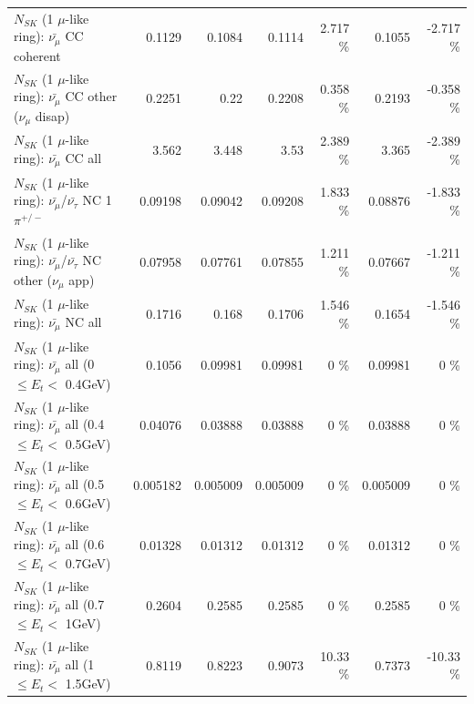 \begin{table}
\begin{tabular}{| l | r | r | r  r | r  r |}
                       $N_{SK}$ (1 $\mu$-like ring): $\bar{\nu_\mu}$ CC coherent &          0.1129 &          0.1084 &          0.1114 &    2.717 \%  &          0.1055 &   -2.717 \%  \\ 
        $N_{SK}$ (1 $\mu$-like ring): $\bar{\nu_\mu}$ CC other ($\nu_\mu$ disap) &          0.2251 &            0.22 &          0.2208 &    0.358 \%  &          0.2193 &   -0.358 \%  \\ 
                          $N_{SK}$ (1 $\mu$-like ring): $\bar{\nu_{\mu}}$ CC all &           3.562 &           3.448 &            3.53 &    2.389 \%  &           3.365 &   -2.389 \%  \\ 
\hline
  $N_{SK}$ (1 $\mu$-like ring): $\bar{\nu_\mu}$/$\bar{\nu_\tau}$ NC 1$\pi^{+/-}$ &         0.09198 &         0.09042 &         0.09208 &    1.833 \%  &         0.08876 &   -1.833 \%  \\ 
$N_{SK}$ (1 $\mu$-like ring): $\bar{\nu_\mu}$/$\bar{\nu_\tau}$ NC other ($\nu_\mu$ app) &         0.07958 &         0.07761 &         0.07855 &    1.211 \%  &         0.07667 &   -1.211 \%  \\ 
                          $N_{SK}$ (1 $\mu$-like ring): $\bar{\nu_{\mu}}$ NC all &          0.1716 &           0.168 &          0.1706 &    1.546 \%  &          0.1654 &   -1.546 \%  \\ 
\hline
   $N_{SK}$ (1 $\mu$-like ring): $\bar{\nu_{\mu}}$ all (0 $\leq E_{t} <$ 0.4GeV) &          0.1056 &         0.09981 &         0.09981 &        0 \%  &         0.09981 &        0 \%  \\ 
 $N_{SK}$ (1 $\mu$-like ring): $\bar{\nu_{\mu}}$ all (0.4 $\leq E_{t} <$ 0.5GeV) &         0.04076 &         0.03888 &         0.03888 &        0 \%  &         0.03888 &        0 \%  \\ 
 $N_{SK}$ (1 $\mu$-like ring): $\bar{\nu_{\mu}}$ all (0.5 $\leq E_{t} <$ 0.6GeV) &        0.005182 &        0.005009 &        0.005009 &        0 \%  &        0.005009 &        0 \%  \\ 
 $N_{SK}$ (1 $\mu$-like ring): $\bar{\nu_{\mu}}$ all (0.6 $\leq E_{t} <$ 0.7GeV) &         0.01328 &         0.01312 &         0.01312 &        0 \%  &         0.01312 &        0 \%  \\ 
   $N_{SK}$ (1 $\mu$-like ring): $\bar{\nu_{\mu}}$ all (0.7 $\leq E_{t} <$ 1GeV) &          0.2604 &          0.2585 &          0.2585 &        0 \%  &          0.2585 &        0 \%  \\ 
   $N_{SK}$ (1 $\mu$-like ring): $\bar{\nu_{\mu}}$ all (1 $\leq E_{t} <$ 1.5GeV) &          0.8119 &          0.8223 &          0.9073 &    10.33 \%  &          0.7373 &   -10.33 \%  \\ 

\end{tabular}
\end{table}
